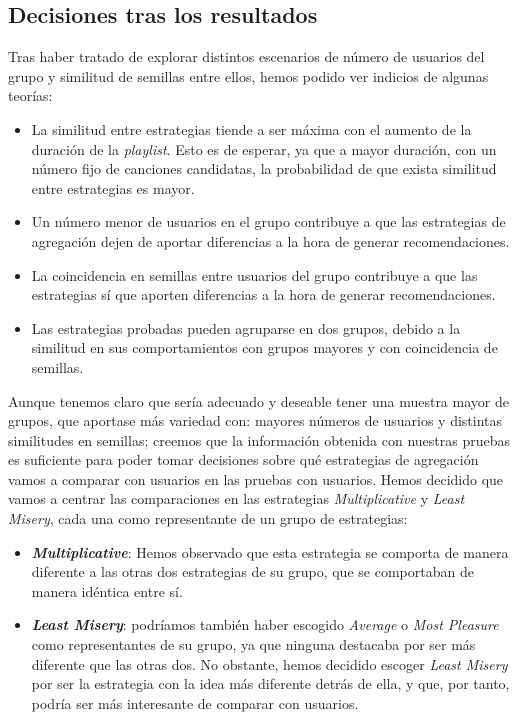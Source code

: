 \subsection{Decisiones tras los resultados\label{SEC:DECISIONES_TRAS_RESULTADOS}}

Tras haber tratado de explorar distintos escenarios de número de usuarios del grupo y similitud de semillas entre ellos, hemos podido
ver indicios de algunas teorías:

\begin{itemize}
    \item La similitud entre estrategias tiende a ser máxima con el aumento de la duración de la \textit{playlist}. Esto es de esperar, ya que a mayor duración, 
    con un número fijo de canciones candidatas, la probabilidad de que exista similitud entre estrategias es mayor.
    \item Un número menor de usuarios en el grupo contribuye a que las estrategias de agregación dejen de aportar diferencias a la hora de generar recomendaciones.
    \item La coincidencia en semillas entre usuarios del grupo contribuye a que las estrategias sí que aporten diferencias a la hora de generar recomendaciones.
    \item Las estrategias probadas pueden agruparse en dos grupos, debido a la similitud en sus comportamientos con grupos mayores y con coincidencia
    de semillas.
\end{itemize}

Aunque tenemos claro que sería adecuado y deseable tener una muestra mayor de grupos, que aportase más variedad con: mayores números de usuarios y distintas similitudes en semillas;
creemos que la información obtenida con nuestras pruebas es suficiente para poder tomar decisiones sobre qué estrategias de agregación vamos a comparar con usuarios en las pruebas con usuarios.
Hemos decidido que vamos a centrar las comparaciones en las estrategias \textit{Multiplicative} y \textit{Least Misery}, cada una como representante de un 
grupo de estrategias:

\begin{itemize}
    \item \textbf{\textit{Multiplicative}}: Hemos observado que esta estrategia se comporta de manera diferente a las otras dos estrategias de su grupo, que se comportaban de 
    manera idéntica entre sí. 
    \item \textbf{\textit{Least Misery}}: podríamos también haber escogido \textit{Average} o \textit{Most Pleasure} como representantes de su grupo, ya que ninguna destacaba por ser
    más diferente que las otras dos. No obstante, hemos decidido escoger \textit{Least Misery} por ser la estrategia con la idea más diferente detrás de ella, y que, por tanto,
    podría ser más interesante de comparar con usuarios.
\end{itemize}